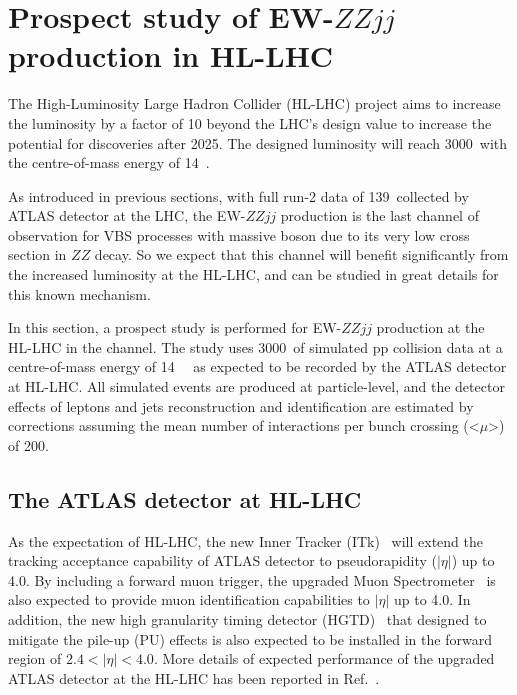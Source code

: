 \section{Prospect study of EW-$ZZjj$ production in HL-LHC}

The High-Luminosity Large Hadron Collider (HL-LHC) project aims to increase the luminosity by a factor of 10 beyond the LHC’s design value 
to increase the potential for discoveries after 2025.
The designed luminosity will reach 3000~\ifb with the centre-of-mass energy of 14~\tev.

As introduced in previous sections, with full run-2 data of 139~\ifb collected by ATLAS detector at the LHC, 
the EW-$ZZjj$ production is the last channel of observation for VBS processes with massive boson 
due to its very low cross section in $ZZ$ decay.
So we expect that this channel will benefit significantly from the increased luminosity at the HL-LHC,
and can be studied in great details for this known mechanism.

In this section, a prospect study is performed for EW-$ZZjj$ production at the HL-LHC in the \llll channel.
The study uses 3000~\ifb of simulated pp collision data at a centre-of-mass energy of 14~\tev~ as expected to be recorded by the ATLAS detector at HL-LHC.
All simulated events are produced at particle-level, 
and the detector effects of leptons and jets reconstruction and identification are estimated by corrections
assuming the mean number of interactions per bunch crossing (<$\mu$>) of 200.

\subsection{The ATLAS detector at HL-LHC}

As the expectation of HL-LHC, the new Inner Tracker (ITk)~\cite{Collaboration:2285585}
 will extend the tracking acceptance capability of ATLAS detector to pseudorapidity ($|\eta|$) up to 4.0.
By including a forward muon trigger, the upgraded Muon Spectrometer~\cite{Collaboration:2285580} is also expected to provide 
muon identification capabilities to $|\eta|$ up to 4.0.
In addition, the new high granularity timing detector (HGTD)~\cite{Collaboration:2623663} that designed to mitigate the pile-up (PU) effects 
is also expected to be installed in the forward region of $2.4 < |\eta| < 4.0$.
More details of expected performance of the upgraded ATLAS detector at the HL-LHC has been reported in Ref.~\cite{ATL-PHYS-PUB-2016-026}.


